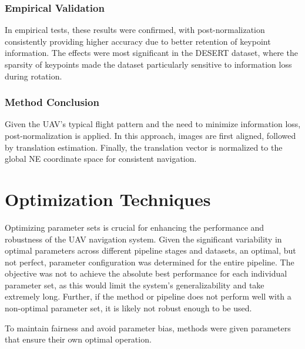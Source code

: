 \subsubsection*{Empirical Validation}

In empirical tests, these results were confirmed, with post-normalization consistently providing higher accuracy due to better retention of keypoint information. The effects were most significant in the DESERT dataset, where the sparsity of keypoints made the dataset particularly sensitive to information loss during rotation. 

\subsubsection*{Method Conclusion}

Given the UAV's typical flight pattern and the need to minimize information loss, post-normalization is applied. In this approach, images are first aligned, followed by translation estimation. Finally, the translation vector is normalized to the global NE coordinate space for consistent navigation.









\section*{Optimization Techniques}

Optimizing parameter sets is crucial for enhancing the performance and robustness of the UAV navigation system. Given the significant variability in optimal parameters across different pipeline stages and datasets, an optimal, but not perfect, parameter configuration was determined for the entire pipeline. The objective was not to achieve the absolute best performance for each individual parameter set, as this would limit the system's generalizability and take extremely long. Further, if the method or pipeline does not perform well with a non-optimal parameter set, it is likely not robust enough to be used.

To maintain fairness and avoid parameter bias, methods were given parameters that ensure their own optimal operation.

